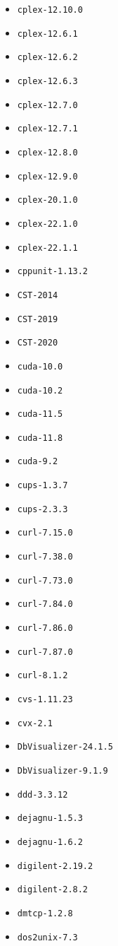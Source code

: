 \begin{itemize}
\item \verb|cplex-12.10.0|
\item \verb|cplex-12.6.1|
\item \verb|cplex-12.6.2|
\item \verb|cplex-12.6.3|
\item \verb|cplex-12.7.0|
\item \verb|cplex-12.7.1|
\item \verb|cplex-12.8.0|
\item \verb|cplex-12.9.0|
\item \verb|cplex-20.1.0|
\item \verb|cplex-22.1.0|
\item \verb|cplex-22.1.1|
\item \verb|cppunit-1.13.2|
\item \verb|CST-2014|
\item \verb|CST-2019|
\item \verb|CST-2020|
\item \verb|cuda-10.0|
\item \verb|cuda-10.2|
\item \verb|cuda-11.5|
\item \verb|cuda-11.8|
\item \verb|cuda-9.2|
\item \verb|cups-1.3.7|
\item \verb|cups-2.3.3|
\item \verb|curl-7.15.0|
\item \verb|curl-7.38.0|
\item \verb|curl-7.73.0|
\item \verb|curl-7.84.0|
\item \verb|curl-7.86.0|
\item \verb|curl-7.87.0|
\item \verb|curl-8.1.2|
\item \verb|cvs-1.11.23|
\item \verb|cvx-2.1|
\item \verb|DbVisualizer-24.1.5|
\item \verb|DbVisualizer-9.1.9|
\item \verb|ddd-3.3.12|
\item \verb|dejagnu-1.5.3|
\item \verb|dejagnu-1.6.2|
\item \verb|digilent-2.19.2|
\item \verb|digilent-2.8.2|
\item \verb|dmtcp-1.2.8|
\item \verb|dos2unix-7.3|

\end{itemize}
